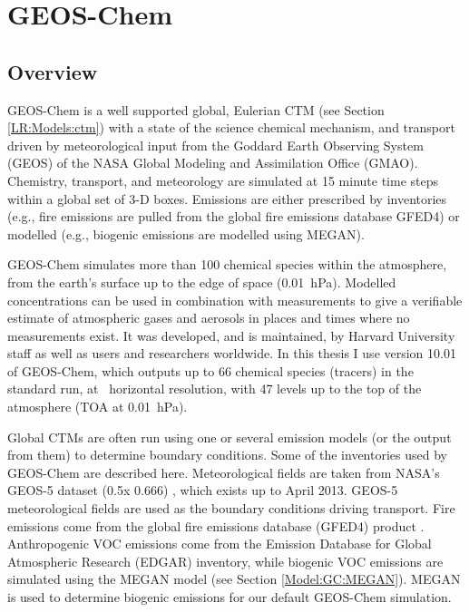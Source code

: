 \section{GEOS-Chem}
  \label{Model:GC}

  \subsection{Overview}
    GEOS-Chem is a well supported global, Eulerian CTM (see Section \ref{LR:Models:ctm}) with a state of the science chemical mechanism, and transport driven by meteorological input from the Goddard Earth Observing System (GEOS) of the NASA Global Modeling and Assimilation Office (GMAO).
    Chemistry, transport, and meteorology are simulated at 15 minute time steps within a global set of 3-D boxes.
    Emissions are either prescribed by inventories (e.g., fire emissions are pulled from the global fire emissions database GFED4) or modelled (e.g., biogenic emissions are modelled using MEGAN).
    
    GEOS-Chem simulates more than 100 chemical species within the atmosphere, from the earth's surface up to the edge of space (0.01~hPa).
    Modelled concentrations can be used in combination with measurements to give a verifiable estimate of atmospheric gases and aerosols in places and times where no measurements exist.
    It was developed, and is maintained, by Harvard University staff as well as users and researchers worldwide.
    In this thesis I use version 10.01 of GEOS-Chem, which outputs up to 66 chemical species (tracers) in the standard run, at \lowhr ~horizontal resolution, with 47 levels up to the top of the atmosphere (TOA at 0.01~hPa).
    
    
    Global CTMs are often run using one or several emission models (or the output from them) to determine boundary conditions.
    Some of the inventories used by GEOS-Chem are described here.
    Meteorological fields are taken from NASA's GEOS-5 dataset (0.5\degr x 0.666\degr) \parencite{Chen2009}, which exists up to April 2013.
    GEOS-5 meteorological fields are used as the boundary conditions driving transport.
    Fire emissions come from the global fire emissions database (GFED4) product \parencite{Giglio2013}. 
    Anthropogenic VOC emissions come from the Emission Database for Global Atmospheric Research (EDGAR) inventory, while biogenic VOC emissions are simulated using the MEGAN model (see Section \ref{Model:GC:MEGAN}).
    MEGAN is used to determine biogenic emissions for our default GEOS-Chem simulation.
    

